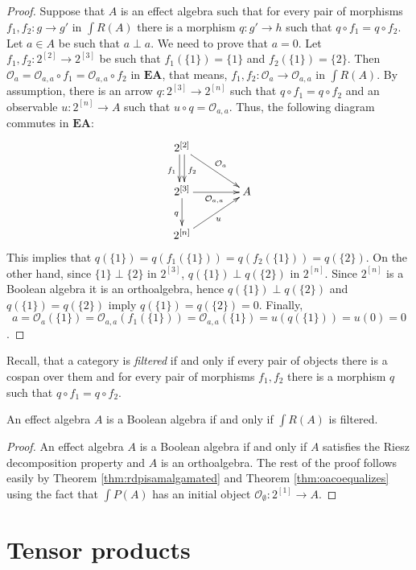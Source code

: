 \documentclass[smallextended]{svjour3}
\begin{document}
\begin{proof}
Suppose that $A$ is an effect algebra such that 
for every pair of morphisms $f_1,f_2:g\to g'$ in ${\int R({A})}$
there is a morphism $q:g'\to h$ such that $q\circ f_1=q\circ f_2$. 
Let $a\in A$ be such that $a\perp a$. We need to prove that $a=0$.
Let $f_1,f_2:2^{[2]}\to 2^{[3]}$ be such that $f_1(\{1\})=\{1\}$ and
$f_2(\{1\})=\{2\}$. Then ${\mathcal O_{{a}}}={\mathcal O_{{a,a}}}\circ f_1={\mathcal O_{{a,a}}}\circ f_2$ in ${\mathbf{EA}}$, that means,
$f_1,f_2:{\mathcal O_{{a}}}\to {\mathcal O_{{a,a}}}$ in ${\int R({A})}$. By assumption, there is an arrow
$q:2^{[3]}\to 2^{[n]}$ such that $q\circ f_1=q\circ f_2$ 
and an observable $u:2^{[n]}\to A$ such that $u\circ q={\mathcal O_{{a,a}}}$.
Thus, the following diagram commutes in ${\mathbf{EA}}$:
\begin{equation}
\xymatrix@C=4em{
2^{[2]}
	\ar@<-.5ex>[d]_{f_1}
	\ar@<.5ex>[d]^{f_2}
	\ar[rd]^{{\mathcal O_{{a}}}}
&
~
\\
2^{[3]}
	\ar[r]_{{\mathcal O_{{a,a}}}}
	\ar[d]_q
&
A
\\
2^{[n]}
	\ar[ru]_u
}
\end{equation}
This implies that $q(\{1\})=q(f_1(\{1\}))=q(f_2(\{1\}))=q(\{2\})$. On the other hand,
since $\{1\}\perp\{2\}$ in $2^{[3]}$, $q(\{1\})\perp q(\{2\})$ in $2^{[n]}$. Since
$2^{[n]}$ is a Boolean algebra it is an orthoalgebra,
hence $q(\{1\})\perp q(\{2\})$ and $q(\{1\})=q(\{2\})$ imply 
$q(\{1\})=q(\{2\})=0$. Finally,
$$
a={\mathcal O_{{a}}}(\{1\})={\mathcal O_{{a,a}}}(f_1(\{1\}))={\mathcal O_{{a,a}}}(\{1\})=u(q(\{1\}))=u(0)=0
$$.
\end{proof}
Recall, that a category is {\em filtered} if and only if
every pair of objects there is a cospan over them and for every pair of
morphisms $f_1,f_2$ there is a morphism $q$ such that $q\circ f_1=q\circ f_2$.
\begin{corollary}
An effect algebra $A$ is a Boolean algebra if and only if ${\int R({A})}$ is filtered.
\end{corollary}
\begin{proof}
An effect algebra $A$ is a Boolean algebra if and only if $A$ satisfies the
Riesz decomposition property and $A$ is an orthoalgebra.  The rest of the proof
follows easily by Theorem \ref{thm:rdpisamalgamated} and Theorem
\ref{thm:oacoequalizes} using the fact that $\int P(A)$ has an initial object
${\mathcal O_{{\emptyset}}}:2^{[1]}\to A$.
\end{proof}

\section{Tensor products}
\end{document}
